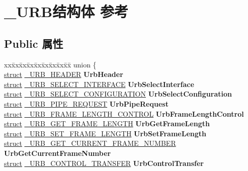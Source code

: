 \hypertarget{struct___u_r_b}{}\section{\+\_\+\+U\+R\+B结构体 参考}
\label{struct___u_r_b}
\subsection*{Public 属性}
\begin{DoxyCompactItemize}
\item 
\mbox{\label{struct___u_r_b_a7940dd0eb6bd4c81e571959e305d2141}} 
\begin{tabbing}
xx\=xx\=xx\=xx\=xx\=xx\=xx\=xx\=xx\=\kill
union \{\\
\>\hyperlink{interfacestruct}{struct} \hyperlink{struct___u_r_b___h_e_a_d_e_r}{\_URB\_HEADER} {\bfseries UrbHeader}\\
\>\hyperlink{interfacestruct}{struct} \hyperlink{struct___u_r_b___s_e_l_e_c_t___i_n_t_e_r_f_a_c_e}{\_URB\_SELECT\_INTERFACE} {\bfseries UrbSelectInterface}\\
\>\hyperlink{interfacestruct}{struct} \hyperlink{struct___u_r_b___s_e_l_e_c_t___c_o_n_f_i_g_u_r_a_t_i_o_n}{\_URB\_SELECT\_CONFIGURATION} {\bfseries UrbSelectConfiguration}\\
\>\hyperlink{interfacestruct}{struct} \hyperlink{struct___u_r_b___p_i_p_e___r_e_q_u_e_s_t}{\_URB\_PIPE\_REQUEST} {\bfseries UrbPipeRequest}\\
\>\hyperlink{interfacestruct}{struct} \hyperlink{struct___u_r_b___f_r_a_m_e___l_e_n_g_t_h___c_o_n_t_r_o_l}{\_URB\_FRAME\_LENGTH\_CONTROL} {\bfseries UrbFrameLengthControl}\\
\>\hyperlink{interfacestruct}{struct} \hyperlink{struct___u_r_b___g_e_t___f_r_a_m_e___l_e_n_g_t_h}{\_URB\_GET\_FRAME\_LENGTH} {\bfseries UrbGetFrameLength}\\
\>\hyperlink{interfacestruct}{struct} \hyperlink{struct___u_r_b___s_e_t___f_r_a_m_e___l_e_n_g_t_h}{\_URB\_SET\_FRAME\_LENGTH} {\bfseries UrbSetFrameLength}\\
\>\hyperlink{interfacestruct}{struct} \hyperlink{struct___u_r_b___g_e_t___c_u_r_r_e_n_t___f_r_a_m_e___n_u_m_b_e_r}{\_URB\_GET\_CURRENT\_FRAME\_NUMBER} {\bfseries UrbGetCurrentFrameNumber}\\
\>\hyperlink{interfacestruct}{struct} \hyperlink{struct___u_r_b___c_o_n_t_r_o_l___t_r_a_n_s_f_e_r}{\_URB\_CONTROL\_TRANSFER} {\bfseries UrbControlTransfer}\\

\end{tabbing}
\end{DoxyCompactItemize}

